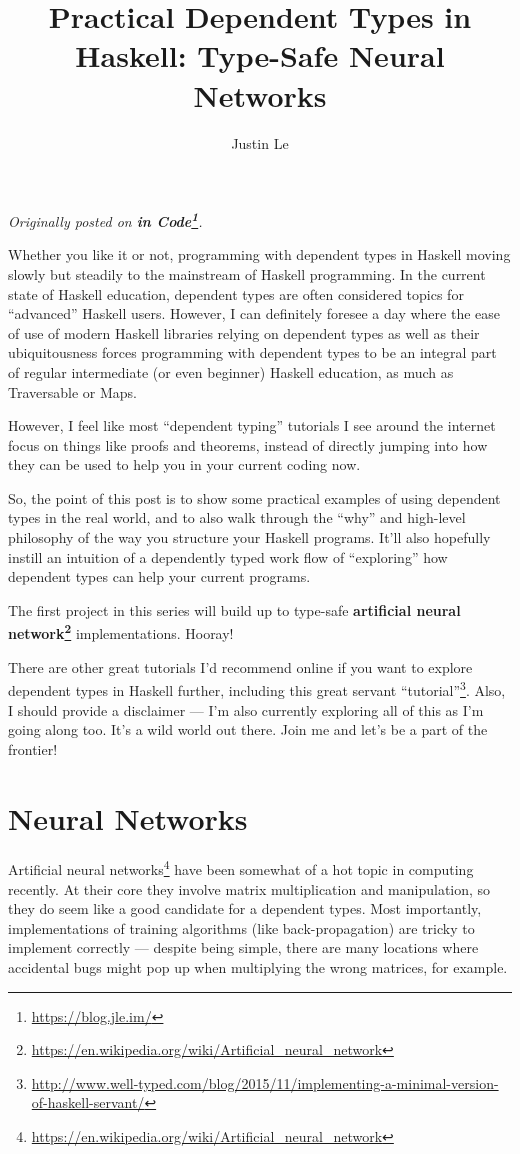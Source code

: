\documentclass[]{article}
\title{Practical Dependent Types in Haskell: Type-Safe Neural Networks}
\author{Justin Le}
\renewcommand{\href}[2]{#2\footnote{\url{#1}}}
\begin{document}
\maketitle

\emph{Originally posted on \textbf{\href{https://blog.jle.im/}{in
Code}}.}

Whether you like it or not, programming with dependent types in Haskell
moving slowly but steadily to the mainstream of Haskell programming. In
the current state of Haskell education, dependent types are often
considered topics for ``advanced'' Haskell users. However, I can
definitely foresee a day where the ease of use of modern Haskell
libraries relying on dependent types as well as their ubiquitousness
forces programming with dependent types to be an integral part of
regular intermediate (or even beginner) Haskell education, as much as
Traversable or Maps.

However, I feel like most ``dependent typing'' tutorials I see around
the internet focus on things like proofs and theorems, instead of
directly jumping into how they can be used to help you in your current
coding now.

So, the point of this post is to show some practical examples of using
dependent types in the real world, and to also walk through the ``why''
and high-level philosophy of the way you structure your Haskell
programs. It'll also hopefully instill an intuition of a dependently
typed work flow of ``exploring'' how dependent types can help your
current programs.

The first project in this series will build up to type-safe
\textbf{\href{https://en.wikipedia.org/wiki/Artificial_neural_network}{artificial
neural network}} implementations. Hooray!

There are other great tutorials I'd recommend online if you want to
explore dependent types in Haskell further, including
\href{http://www.well-typed.com/blog/2015/11/implementing-a-minimal-version-of-haskell-servant/}{this
great servant ``tutorial''}. Also, I should provide a disclaimer --- I'm
also currently exploring all of this as I'm going along too. It's a wild
world out there. Join me and let's be a part of the frontier!

\section{Neural Networks}\label{neural-networks}

\href{https://en.wikipedia.org/wiki/Artificial_neural_network}{Artificial
neural networks} have been somewhat of a hot topic in computing
recently. At their core they involve matrix multiplication and
manipulation, so they do seem like a good candidate for a dependent
types. Most importantly, implementations of training algorithms (like
back-propagation) are tricky to implement correctly --- despite being
simple, there are many locations where accidental bugs might pop up when
multiplying the wrong matrices, for example.
\end{document}
